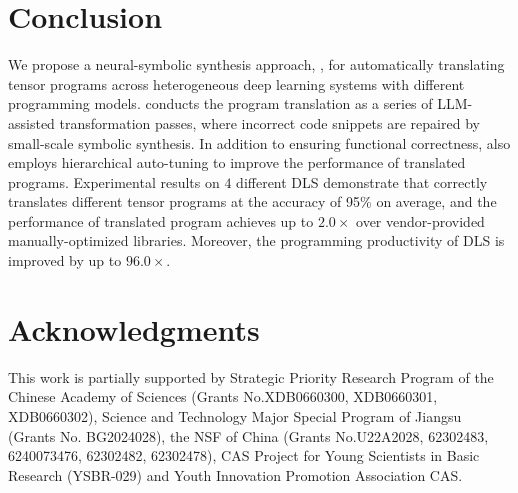 \section{Conclusion}
We propose a neural-symbolic synthesis approach, \name{}, for automatically translating tensor programs across heterogeneous deep learning systems with different programming models. \name{} conducts the program translation as a series of LLM-assisted transformation passes, where incorrect code snippets are repaired by small-scale symbolic synthesis. In addition to ensuring functional correctness, \name{} also employs hierarchical auto-tuning to improve the performance of translated programs. Experimental results on $4$ different DLS demonstrate that \name{} correctly translates different tensor programs at the accuracy of 95\% on average, and the performance of translated program achieves up to $2.0\times$ over vendor-provided manually-optimized libraries. Moreover, the programming productivity of DLS is improved by up to $96.0\times$.

\section*{Acknowledgments}

This work is partially supported by Strategic Priority Research Program of the Chinese Academy of Sciences (Grants No.XDB0660300, XDB0660301, XDB0660302), Science and Technology Major Special Program of Jiangsu (Grants No. BG2024028), the NSF of China (Grants No.U22A2028, 62302483, 6240073476, 62302482, 62302478), CAS Project for Young Scientists in Basic Research (YSBR-029) and Youth Innovation Promotion Association CAS.







